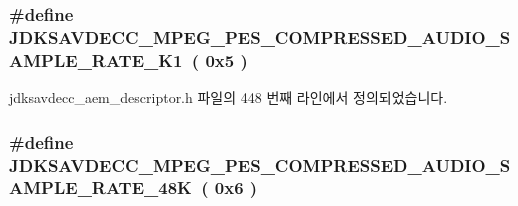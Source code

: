 \subsubsection[{\texorpdfstring{J\+D\+K\+S\+A\+V\+D\+E\+C\+C\+\_\+\+M\+P\+E\+G\+\_\+\+P\+E\+S\+\_\+\+C\+O\+M\+P\+R\+E\+S\+S\+E\+D\+\_\+\+A\+U\+D\+I\+O\+\_\+\+S\+A\+M\+P\+L\+E\+\_\+\+R\+A\+T\+E\+\_\+44\+K1}{JDKSAVDECC_MPEG_PES_COMPRESSED_AUDIO_SAMPLE_RATE_44K1}}]{\setlength{\rightskip}{0pt plus 5cm}\#define J\+D\+K\+S\+A\+V\+D\+E\+C\+C\+\_\+\+M\+P\+E\+G\+\_\+\+P\+E\+S\+\_\+\+C\+O\+M\+P\+R\+E\+S\+S\+E\+D\+\_\+\+A\+U\+D\+I\+O\+\_\+\+S\+A\+M\+P\+L\+E\+\_\+\+R\+A\+T\+E\+\_\+K1~( 0x5 )}\hypertarget{group__mpeg__pes__compressed__audio__sample__rate_ga28d3644123f83f06fb879fa07b179ed1}{}\label{group__mpeg__pes__compressed__audio__sample__rate_ga28d3644123f83f06fb879fa07b179ed1}


jdksavdecc\+\_\+aem\+\_\+descriptor.\+h 파일의 448 번째 라인에서 정의되었습니다.

\subsubsection[{\texorpdfstring{J\+D\+K\+S\+A\+V\+D\+E\+C\+C\+\_\+\+M\+P\+E\+G\+\_\+\+P\+E\+S\+\_\+\+C\+O\+M\+P\+R\+E\+S\+S\+E\+D\+\_\+\+A\+U\+D\+I\+O\+\_\+\+S\+A\+M\+P\+L\+E\+\_\+\+R\+A\+T\+E\+\_\+48K}{JDKSAVDECC_MPEG_PES_COMPRESSED_AUDIO_SAMPLE_RATE_48K}}]{\setlength{\rightskip}{0pt plus 5cm}\#define J\+D\+K\+S\+A\+V\+D\+E\+C\+C\+\_\+\+M\+P\+E\+G\+\_\+\+P\+E\+S\+\_\+\+C\+O\+M\+P\+R\+E\+S\+S\+E\+D\+\_\+\+A\+U\+D\+I\+O\+\_\+\+S\+A\+M\+P\+L\+E\+\_\+\+R\+A\+T\+E\+\_\+48K~( 0x6 )}\hypertarget{group__mpeg__pes__compressed__audio__sample__rate_ga4f2265d18f3a3d2986af6cab9ce29025}{}\label{group__mpeg__pes__compressed__audio__sample__rate_ga4f2265d18f3a3d2986af6cab9ce29025}


